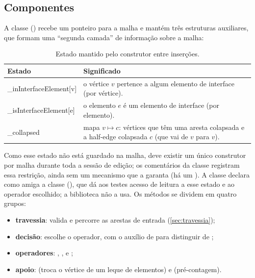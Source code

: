 \subsection{Componentes}

A classe  () recebe um ponteiro para a malha
 e mantém três estruturas auxiliares, que formam uma ``segunda camada'' de informação sobre a malha:

\begin{table}[ht]
\centering\small
\begin{tabularx}{\linewidth}{>{\ttfamily\small}p{4.2cm}X}
\toprule
\normalfont Estado & Significado\\
\midrule
\_inInterfaceElement[v] & o vértice $v$ pertence a algum elemento de interface (por vértice).\\
\_isInterfaceElement[e] & o elemento $e$ é um elemento de interface (por elemento).\\
\_collapsed & mapa $v\mapsto c$: vértices que têm uma aresta colapsada e a half-edge colapsada $c$ (que vai de $v$
para $v$).\\
\bottomrule
\end{tabularx}
\caption{Estado mantido pelo construtor entre inserções.}
\label{tab:estado}
\end{table}

Como esse estado não está guardado na malha, deve existir um único construtor por malha durante toda a sessão de
edição; os comentários da classe registram essa restrição, ainda sem um mecanismo que a garanta (há um ).
A classe declara como amiga a classe  (), que dá aos testes acesso de leitura
a esse estado e ao operador escolhido; a biblioteca não a usa. Os métodos se dividem em quatro grupos:

\begin{itemize}
\item \textbf{travessia}:  valida e percorre as arestas de entrada (\cref{sec:travessia});
\item \textbf{decisão}:  escolhe o operador, com o auxílio de  para
distinguir  de ;
\item \textbf{operadores}: , ,  e ;
\item \textbf{apoio}:  (troca o vértice de um leque de elementos) e
 (pré-contagem).
\end{itemize}


